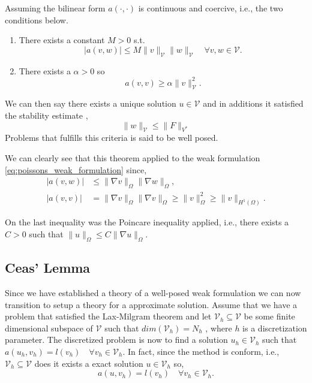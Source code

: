  Assuming the bilinear form $a\left( \cdot ,\cdot  \right) $  is continuous and coercive, i.e., the two conditions below.

\begin{enumerate}[label=\arabic*)]
    \item There exists a constant $M>0$ s.t. \[
    \left\lvert a\left( v,w \right)  \right\rvert \le M \| v \|_{ \mathcal{V}  }^{  } \| w \|_{ \mathcal{V}  }^{  }  \quad \forall v,w \in \mathcal{V}.
    \]
\item There exists a $\alpha  > 0$  so \[
a\left( v,v \right)  \ge  \alpha \| v \|_{ \mathcal{V}  }^{ 2 }.
\]
\end{enumerate}

We can then say there exists a unique solution $u \in \mathcal{V} $ and in additions it satisfied the stability estimate \cite{manzoni2021optimal}, \[
\| w \|_{ \mathcal{V}   }^{  } \le  \| F \|_{ V^{*} }^{  }
\]
Problems that fulfills this criteria is said to be well posed.


We can clearly see that this theorem applied to the weak formulation \eqref{eq:poissons_weak_formulation} since,
\[
\begin{split}
    \left\lvert a\left( v,w \right)  \right\rvert & \le \| \nabla v \|_{ \Omega  }^{  } \| \nabla w \|_{ \Omega  }^{  }, \\
\left\lvert a\left( v,v \right)  \right\rvert  & = \|  \nabla v\|_{\Omega   }^{  }  \| \nabla v  \|_{\Omega   }^{  } \ge  \| v \|_{ \Omega  }^{ 2 } \ge \| v \|_{ H^{1}\left( \Omega  \right)  }^{  }.
\end{split}
\]

On the last inequality was the Poincare inequality applied, i.e., there exists a $C>0$  such that $\| u \|_{ \Omega  }^{  } \le C  \| \nabla u \|_{\Omega   }^{  } $.


\subsection{Ceas' Lemma}%
\label{sub:ceas_lemma}

Since we have established a theory of a well-posed weak formulation we can now transition to setup a theory for a approximate solution. Assume that we have a problem that satisfied the Lax-Milgram theorem and let $\mathcal{V} _{h} \subseteq  \mathcal{V} $  be
some finite dimensional subspace of $\mathcal{V} $ such that $dim\left( \mathcal{V} _{h} \right) =N_{h}$ , where $h$  is a discretization parameter. The discretized problem is now to find a solution $u_{h} \in  \mathcal{V}_{h}$ such that $a\left( u_{h},v_{h} \right)  =
l\left( v_{h} \right) \quad  \forall v_{h} \in \mathcal{V} _{h} $. In fact, since the method is conform, i.e., $\mathcal{V} _{h} \subseteq  \mathcal{V} $ does it exists a exact solution $u \in  \mathcal{V} _{h}$ so, \[
a \left( u, v_{h} \right)  = l\left( v_{h} \right)  \quad  \forall v_{h} \in  \mathcal{V} _{h}.
\]

